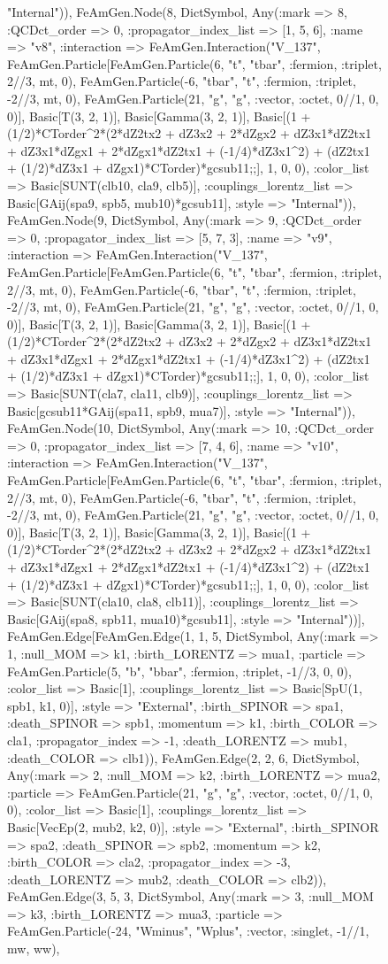 \documentclass{revtex4}
\begin{document}
\begin{figure}[!htb]
\begin{center}
{"Internal")), FeAmGen.Node(8, Dict{Symbol, Any}(:mark => 8, :QCDct_order => 0, :propagator_index_list => [1, 5, 6], :name => "v8", :interaction => FeAmGen.Interaction("V_137", FeAmGen.Particle[FeAmGen.Particle(6, "t", "tbar", :fermion, :triplet, 2//3, mt, 0), FeAmGen.Particle(-6, "tbar", "t", :fermion, :triplet, -2//3, mt, 0), FeAmGen.Particle(21, "g", "g", :vector, :octet, 0//1, 0, 0)], Basic[T(3, 2, 1)], Basic[Gamma(3, 2, 1)], Basic[(1 + (1/2)*CTorder^2*(2*dZ2tx2 + dZ3x2 + 2*dZgx2 + dZ3x1*dZ2tx1 + dZ3x1*dZgx1 + 2*dZgx1*dZ2tx1 + (-1/4)*dZ3x1^2) + (dZ2tx1 + (1/2)*dZ3x1 + dZgx1)*CTorder)*gcsub11;;], 1, 0, 0), :color_list => Basic[SUNT(clb10, cla9, clb5)], :couplings_lorentz_list => Basic[GAij(spa9, spb5, mub10)*gcsub11], :style => "Internal")), FeAmGen.Node(9, Dict{Symbol, Any}(:mark => 9, :QCDct_order => 0, :propagator_index_list => [5, 7, 3], :name => "v9", :interaction => FeAmGen.Interaction("V_137", FeAmGen.Particle[FeAmGen.Particle(6, "t", "tbar", :fermion, :triplet, 2//3, mt, 0), FeAmGen.Particle(-6, "tbar", "t", :fermion, :triplet, -2//3, mt, 0), FeAmGen.Particle(21, "g", "g", :vector, :octet, 0//1, 0, 0)], Basic[T(3, 2, 1)], Basic[Gamma(3, 2, 1)], Basic[(1 + (1/2)*CTorder^2*(2*dZ2tx2 + dZ3x2 + 2*dZgx2 + dZ3x1*dZ2tx1 + dZ3x1*dZgx1 + 2*dZgx1*dZ2tx1 + (-1/4)*dZ3x1^2) + (dZ2tx1 + (1/2)*dZ3x1 + dZgx1)*CTorder)*gcsub11;;], 1, 0, 0), :color_list => Basic[SUNT(cla7, cla11, clb9)], :couplings_lorentz_list => Basic[gcsub11*GAij(spa11, spb9, mua7)], :style => "Internal")), FeAmGen.Node(10, Dict{Symbol, Any}(:mark => 10, :QCDct_order => 0, :propagator_index_list => [7, 4, 6], :name => "v10", :interaction => FeAmGen.Interaction("V_137", FeAmGen.Particle[FeAmGen.Particle(6, "t", "tbar", :fermion, :triplet, 2//3, mt, 0), FeAmGen.Particle(-6, "tbar", "t", :fermion, :triplet, -2//3, mt, 0), FeAmGen.Particle(21, "g", "g", :vector, :octet, 0//1, 0, 0)], Basic[T(3, 2, 1)], Basic[Gamma(3, 2, 1)], Basic[(1 + (1/2)*CTorder^2*(2*dZ2tx2 + dZ3x2 + 2*dZgx2 + dZ3x1*dZ2tx1 + dZ3x1*dZgx1 + 2*dZgx1*dZ2tx1 + (-1/4)*dZ3x1^2) + (dZ2tx1 + (1/2)*dZ3x1 + dZgx1)*CTorder)*gcsub11;;], 1, 0, 0), :color_list => Basic[SUNT(cla10, cla8, clb11)], :couplings_lorentz_list => Basic[GAij(spa8, spb11, mua10)*gcsub11], :style => "Internal"))], FeAmGen.Edge[FeAmGen.Edge(1, 1, 5, Dict{Symbol, Any}(:mark => 1, :null_MOM => k1, :birth_LORENTZ => mua1, :particle => FeAmGen.Particle(5, "b", "bbar", :fermion, :triplet, -1//3, 0, 0), :color_list => Basic[1], :couplings_lorentz_list => Basic[SpU(1, spb1, k1, 0)], :style => "External", :birth_SPINOR => spa1, :death_SPINOR => spb1, :momentum => k1, :birth_COLOR => cla1, :propagator_index => -1, :death_LORENTZ => mub1, :death_COLOR => clb1)), FeAmGen.Edge(2, 2, 6, Dict{Symbol, Any}(:mark => 2, :null_MOM => k2, :birth_LORENTZ => mua2, :particle => FeAmGen.Particle(21, "g", "g", :vector, :octet, 0//1, 0, 0), :color_list => Basic[1], :couplings_lorentz_list => Basic[VecEp(2, mub2, k2, 0)], :style => "External", :birth_SPINOR => spa2, :death_SPINOR => spb2, :momentum => k2, :birth_COLOR => cla2, :propagator_index => -3, :death_LORENTZ => mub2, :death_COLOR => clb2)), FeAmGen.Edge(3, 5, 3, Dict{Symbol, Any}(:mark => 3, :null_MOM => k3, :birth_LORENTZ => mua3, :particle => FeAmGen.Particle(-24, "Wminus", "Wplus", :vector, :singlet, -1//1, mw, ww), }
\end{center}
\end{figure}
\end{document}
